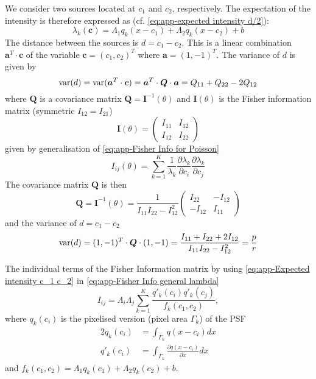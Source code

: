 We consider two sources located at $c_1$ and $c_2$, respectively. The expectation of the intensity is therefore expressed as (cf. \autoref{eq:app-expected intensity d/2}):
%
\begin{equation}
	\lambda_k(\bm{c})=\Lambda_1q_k(x-c_1)+\Lambda_2q_k(x-c_2)+b
	\label{eq:app-Expected intensity c_1 c_2}
\end{equation}
%
The distance between the sources is $d=c_1-c_2$. This is a linear combination $\bm{a}^T\cdot\bm{c}$ of the variable $\bm{c}=(c_1,c_2)^T$ where $\bm{a}=(1,-1)^T$. The variance of $d$ is given by 
%
\begin{equation}
	\mathrm{var}(d)=\mathrm{var}(\bm{a}^T\cdot\bm{c})=\bm{a}^T\cdot\bm{Q}\cdot\bm{a}=Q_{11}+Q_{22}-2Q_{12}
\end{equation}
%
where $\bm{Q}$ is a covariance matrix $\bm{Q}=\bm{I}^{-1}(\theta)$ and $\bm{I}(\theta)$ is the Fisher information matrix (symmetric
$I_{12}=I_{21}$)
%
\begin{equation}
	\bm{I}(\theta)=\left(
	\begin{array}{cc}
		I_{11} & I_{12}\\
		I_{12} & I_{22}
	\end{array}\right)
\end{equation}
%
given by generalisation of \autoref{eq:app-Fisher Info for Poisson}
%
\begin{equation}
	I_{ij}(\theta)=\sum_{k=1}^K\frac{1}{\lambda_k}\frac{\partial\lambda_k}{\partial c_i}\frac{\partial\lambda_k}{\partial c_j}
	\label{eq:app-Fisher Info general lambda}
\end{equation}
%
The covariance matrix $\bm{Q}$ is then 
%
\begin{equation}
	\bm{Q}=\bm{I}^{-1}(\theta)=\frac{1}{I_{11}I_{22}-I_{12}^2}\left(
	\begin{array}{cc}
		I_{22} & -I_{12}\\
		-I_{12} & I_{11}
	\end{array}\right)
\end{equation}
%
and the variance of $d=c_1-c_2$ 
%
\begin{equation}
	\mathrm{var}(d)=(1,-1)^T\cdot\bm{Q}\cdot(1,-1)=\frac{I_{11}+I_{22}+2I_{12}}{I_{11}I_{22}-I_{12}^2}=\frac{p}{r}
	\label{eq:app-variance alternative}
\end{equation}

The individual terms of the Fisher Information matrix by using \autoref{eq:app-Expected intensity c_1 c_2} in \autoref{eq:app-Fisher Info general lambda}
%
\begin{equation}
	I_{ij} =\Lambda_i\Lambda_j\sum_{k=1}^K\frac{q'_k(c_i)q'_k(c_j)}{f_k(c_1,c_2)},
	\label{eq:app-Fisher Information alternative - Individual}
\end{equation}
%
where $q_k(c_i)$ is the pixelised version (pixel area $\Gamma_k$) of the PSF
%
\begin{alignat}{2}
	q_k(c_i) & =\int_{\Gamma_k}q(x-c_i)dx\\
	q'_k(c_i) & =\int_{\Gamma_k}\frac{\partial q(x-c_i)}{\partial x}dx
\end{alignat}
%
and $f_k(c_1,c_2)=\Lambda_1q_k(c_1)+\Lambda_2q_k(c_2)+b$.
 
